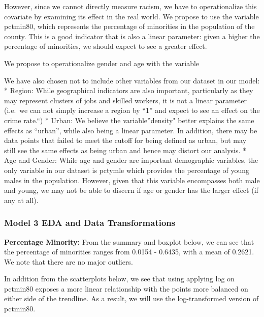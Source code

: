 \documentclass[]{article}
\newenvironment{Shaded}{}{}
\newcommand{\KeywordTok}[1]{\textcolor[rgb]{0.00,0.00,1.00}{#1}}
\newcommand{\NormalTok}[1]{#1}
\newcommand{\OperatorTok}[1]{#1}
\begin{document}
However, since we cannot directly measure racism, we have to
operationalize this covariate by examining its effect in the real world.
We propose to use the variable pctmin80, which represents the percentage
of minorities in the population of the county. This is a good indicator
that is also a linear parameter: given a higher the percentage of
minorities, we should expect to see a greater effect.

We propose to operationalize gender and age with the variable

We have also chosen not to include other variables from our dataset in
our model: * Region: While geographical indicators are also important,
particularly as they may represent clusters of jobs and skilled workers,
it is not a linear parameter (i.e.~we can not simply increase a region
by ``1'' and expect to see an effect on the crime rate.``) * Urban: We
believe the variable''density" better explains the same effects as
``urban'', while also being a linear parameter. In addition, there may
be data points that failed to meet the cutoff for being defined as
urban, but may still see the same effects as being urban and hence may
distort our analysis. * Age and Gender: While age and gender are
important demographic variables, the only variable in our dataset is
pctymle which provides the percentage of young males in the population.
However, given that this variable encompasses both male and young, we
may not be able to discern if age or gender has the larger effect (if
any at all).

\hypertarget{model-3-eda-and-data-transformations}{%
\subsubsection{Model 3 EDA and Data
Transformations}\label{model-3-eda-and-data-transformations}}

\textbf{Percentage Minority:} From the summary and boxplot below, we can
see that the percentage of minorities ranges from 0.0154 - 0.6435, with
a mean of 0.2621. We note that there are no major outliers.

In addition from the scatterplots below, we see that using applying log
on pctmin80 exposes a more linear relationship with the points more
balanced on either side of the trendline. As a result, we will use the
log-transformed version of pctmin80.

\begin{Shaded}
\end{Shaded}
\end{document}
